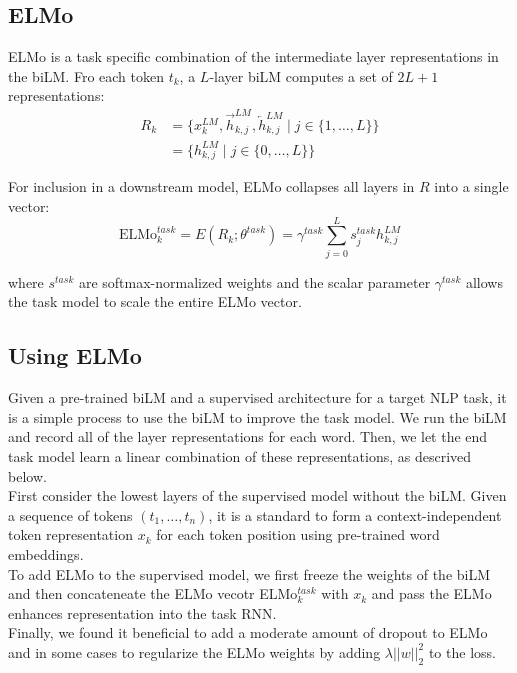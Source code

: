 \subsection{ELMo}

ELMo is a task specific combination of the intermediate layer representations in
the biLM. Fro each token $t_k$, a $L$-layer biLM computes a set of $2L+1$
representations:
\begin{align*}
    R_k &= \{x_k^{LM}, \overrightarrow{h}_{k, j}^{LM}, \overleftarrow{h}_{k, j}^{LM} \mid 
    j \in \{1, \dots, L\}\} \\
    &= \{h_{k, j}^{LM} \mid j \in \{0, \dots, L\}\}
\end{align*}

For inclusion in a downstream model, ELMo collapses all layers in $R$ into a
single vector:
\begin{equation}
   \text{ELMo}_k^{task} = E(R_k; \theta^{task}) = \gamma^{task} \sum_{j=0}^L s_j^{task}
   h_{k, j}^{LM}
\end{equation}

where $s^{task}$ are softmax-normalized weights and the scalar parameter
$\gamma^{task}$ allows the task model to scale the entire ELMo vector.

\subsection{Using ELMo}

Given a pre-trained biLM and a supervised architecture for a target NLP task, it
is a simple process to use the biLM to improve the task model. We run the biLM
and record all of the layer representations for each word. Then, we let the end
task model learn a linear combination of these representations, as descrived
below.\\
First consider the lowest layers of the supervised model without the biLM.
Given a sequence of tokens $(t_1, \dots, t_n)$, it is a standard to form a
context-independent token representation $x_k$ for each token position using
pre-trained word embeddings.\\
To add ELMo to the supervised model, we first freeze the weights of the biLM and
then concateneate the ELMo vecotr ELMo$_k^{task}$ with $x_k$ and pass the ELMo
enhances representation into the task RNN.\\
Finally, we found it beneficial to add a moderate amount of dropout to ELMo and
in some cases to regularize the ELMo weights by adding $\lambda ||w||_2^2$ to
the loss.

